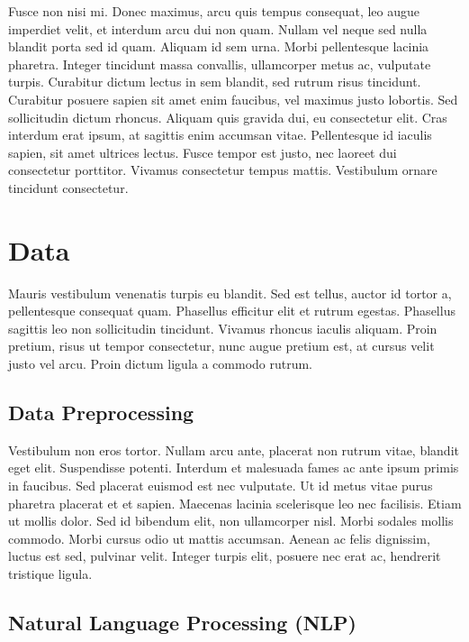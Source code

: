 \documentclass[
]{article}
\begin{document}
Fusce non nisi mi. Donec maximus, arcu quis tempus consequat, leo augue
imperdiet velit, et interdum arcu dui non quam. Nullam vel neque sed
nulla blandit porta sed id quam. Aliquam id sem urna. Morbi pellentesque
lacinia pharetra. Integer tincidunt massa convallis, ullamcorper metus
ac, vulputate turpis. Curabitur dictum lectus in sem blandit, sed rutrum
risus tincidunt. Curabitur posuere sapien sit amet enim faucibus, vel
maximus justo lobortis. Sed sollicitudin dictum rhoncus. Aliquam quis
gravida dui, eu consectetur elit. Cras interdum erat ipsum, at sagittis
enim accumsan vitae. Pellentesque id iaculis sapien, sit amet ultrices
lectus. Fusce tempor est justo, nec laoreet dui consectetur porttitor.
Vivamus consectetur tempus mattis. Vestibulum ornare tincidunt
consectetur.

\newpage

\hypertarget{data}{%
\section{Data}\label{data}}

Mauris vestibulum venenatis turpis eu blandit. Sed est tellus, auctor id
tortor a, pellentesque consequat quam. Phasellus efficitur elit et
rutrum egestas. Phasellus sagittis leo non sollicitudin tincidunt.
Vivamus rhoncus iaculis aliquam. Proin pretium, risus ut tempor
consectetur, nunc augue pretium est, at cursus velit justo vel arcu.
Proin dictum ligula a commodo rutrum.

\hypertarget{data-preprocessing}{%
\subsection{Data Preprocessing}\label{data-preprocessing}}

Vestibulum non eros tortor. Nullam arcu ante, placerat non rutrum vitae,
blandit eget elit. Suspendisse potenti. Interdum et malesuada fames ac
ante ipsum primis in faucibus. Sed placerat euismod est nec vulputate.
Ut id metus vitae purus pharetra placerat et et sapien. Maecenas lacinia
scelerisque leo nec facilisis. Etiam ut mollis dolor. Sed id bibendum
elit, non ullamcorper nisl. Morbi sodales mollis commodo. Morbi cursus
odio ut mattis accumsan. Aenean ac felis dignissim, luctus est sed,
pulvinar velit. Integer turpis elit, posuere nec erat ac, hendrerit
tristique ligula.

\hypertarget{natural-language-processing-nlp}{%
\subsection{Natural Language Processing
(NLP)}\label{natural-language-processing-nlp}}
\end{document}
